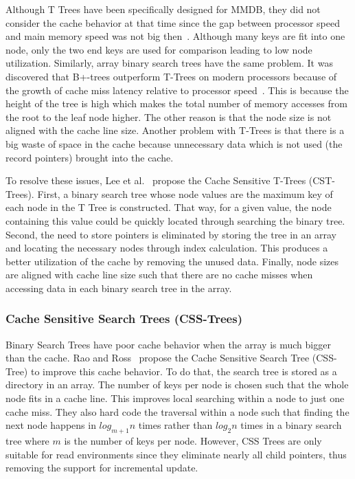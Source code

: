 \documentclass[12pt,a4paper]{article}
\begin{document}
Although T Trees have been specifically designed for MMDB, they did not consider the cache behavior at that time since the gap between processor speed and main
memory speed was not big then~\cite{rao1999cache}. Although many keys are
fit into one node, only the two end keys are used for comparison leading to low node utilization. Similarly, array binary search trees have the same problem. 
It was discovered that B+-trees outperform
T-Trees on modern processors because of the growth of cache miss latency relative to processor speed~\cite{rao1999cache,lee2007cst}. This is because the height
of the tree is high which makes the total number of memory accesses from the root to the leaf node higher. The other reason is that the node size is not aligned
with the cache line size. Another problem with T-Trees is that there is a big waste of space in the cache because unnecessary data which is not used (the
record pointers) brought into the cache.

To resolve these issues, Lee et al.~\cite{lee2007cst} propose the Cache Sensitive T-Trees (CST-Trees). First, a binary
search tree whose node values are the maximum key of each node in the T Tree is constructed. That way, for a given value, the node containing this value could
be quickly located through searching the binary tree. Second, the need to store pointers is eliminated by storing the tree in an array and locating the
necessary nodes through index calculation. This produces a better utilization of the cache by removing the unused data. Finally, node sizes are aligned with
cache line size such that there are no cache misses when accessing data in each
binary search tree in the array.

\subsubsection*{Cache Sensitive Search Trees (CSS-Trees)}

Binary Search Trees have poor cache behavior when the array is much bigger than the cache. Rao and Ross~\cite{rao1999cache} propose the Cache Sensitive Search
Tree (CSS-Tree) to improve this cache behavior. To do that, the search tree is stored as a directory in an array. The number of keys per node is chosen such
that the whole node fits in a cache line. This improves local searching within a node to just one cache miss. They also hard code the traversal within a node
such that finding the next node happens in $log_{m+1}n$ times rather than $log_{2}n$ times in a binary search tree where $m$ is the number of keys per node.
However, CSS Trees are only suitable for read environments since they eliminate nearly all child pointers, thus removing the support for incremental update.
\end{document}
